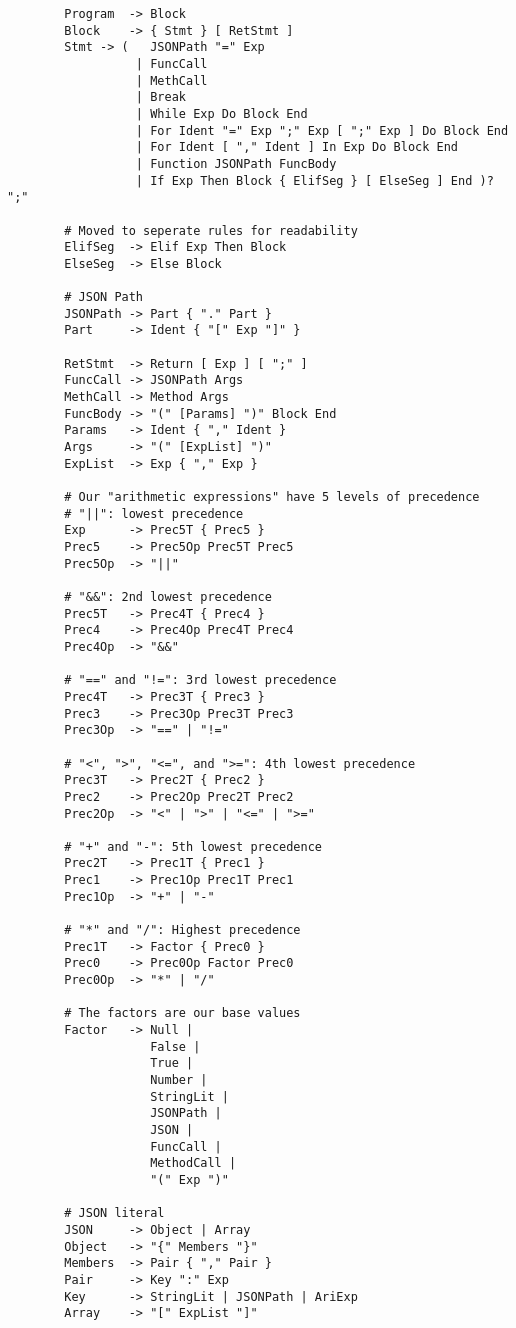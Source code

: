 \documentclass[12pt, letterpaper]{article}
\begin{document}
\begin{center}
    \begin{verbatim}
        Program  -> Block
        Block    -> { Stmt } [ RetStmt ]
        Stmt -> (   JSONPath "=" Exp
                  | FuncCall
                  | MethCall
                  | Break
                  | While Exp Do Block End
                  | For Ident "=" Exp ";" Exp [ ";" Exp ] Do Block End
                  | For Ident [ "," Ident ] In Exp Do Block End
                  | Function JSONPath FuncBody
                  | If Exp Then Block { ElifSeg } [ ElseSeg ] End )? ";"

        # Moved to seperate rules for readability
        ElifSeg  -> Elif Exp Then Block
        ElseSeg  -> Else Block

        # JSON Path
        JSONPath -> Part { "." Part }
        Part     -> Ident { "[" Exp "]" }

        RetStmt  -> Return [ Exp ] [ ";" ]
        FuncCall -> JSONPath Args
        MethCall -> Method Args
        FuncBody -> "(" [Params] ")" Block End
        Params   -> Ident { "," Ident }
        Args     -> "(" [ExpList] ")"
        ExpList  -> Exp { "," Exp }

        # Our "arithmetic expressions" have 5 levels of precedence
        # "||": lowest precedence
        Exp      -> Prec5T { Prec5 }
        Prec5    -> Prec5Op Prec5T Prec5
        Prec5Op  -> "||"

        # "&&": 2nd lowest precedence
        Prec5T   -> Prec4T { Prec4 }
        Prec4    -> Prec4Op Prec4T Prec4
        Prec4Op  -> "&&"

        # "==" and "!=": 3rd lowest precedence
        Prec4T   -> Prec3T { Prec3 }
        Prec3    -> Prec3Op Prec3T Prec3
        Prec3Op  -> "==" | "!="

        # "<", ">", "<=", and ">=": 4th lowest precedence
        Prec3T   -> Prec2T { Prec2 }
        Prec2    -> Prec2Op Prec2T Prec2
        Prec2Op  -> "<" | ">" | "<=" | ">="

        # "+" and "-": 5th lowest precedence
        Prec2T   -> Prec1T { Prec1 }
        Prec1    -> Prec1Op Prec1T Prec1
        Prec1Op  -> "+" | "-"

        # "*" and "/": Highest precedence
        Prec1T   -> Factor { Prec0 }
        Prec0    -> Prec0Op Factor Prec0
        Prec0Op  -> "*" | "/"

        # The factors are our base values
        Factor   -> Null |
                    False |
                    True |
                    Number |
                    StringLit |
                    JSONPath |
                    JSON |
                    FuncCall |
                    MethodCall |
                    "(" Exp ")"

        # JSON literal
        JSON     -> Object | Array
        Object   -> "{" Members "}"
        Members  -> Pair { "," Pair }
        Pair     -> Key ":" Exp
        Key      -> StringLit | JSONPath | AriExp
        Array    -> "[" ExpList "]"
    \end{verbatim}
\end{center}
\end{document}
